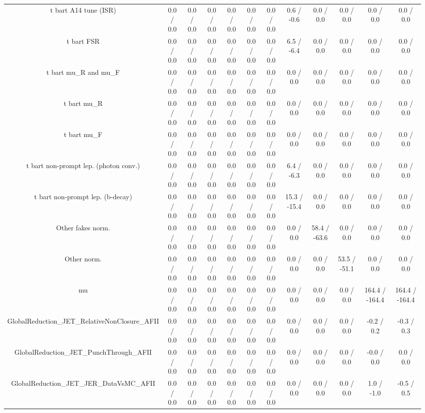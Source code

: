 \begin{table}[htbp]
\begin{center}
\begin{tabular}{|c|c|c|c|c|c|c|c|c|c|c|c|}
  t bar{t} A14 tune (ISR) & 0.0 / 0.0 & 0.0 / 0.0 & 0.0 / 0.0 & 0.0 / 0.0 & 0.0 / 0.0 & 0.0 / 0.0 & 0.6 / -0.6 & 0.0 / 0.0 & 0.0 / 0.0 & 0.0 / 0.0 & 0.0 / 0.0 \\ 
  t bar{t} FSR & 0.0 / 0.0 & 0.0 / 0.0 & 0.0 / 0.0 & 0.0 / 0.0 & 0.0 / 0.0 & 0.0 / 0.0 & 6.5 / -6.4 & 0.0 / 0.0 & 0.0 / 0.0 & 0.0 / 0.0 & 0.0 / 0.0 \\ 
  t bar{t}  mu_{R} and  mu_{F} & 0.0 / 0.0 & 0.0 / 0.0 & 0.0 / 0.0 & 0.0 / 0.0 & 0.0 / 0.0 & 0.0 / 0.0 & 0.0 / 0.0 & 0.0 / 0.0 & 0.0 / 0.0 & 0.0 / 0.0 & 0.0 / 0.0 \\ 
  t bar{t}  mu_{R} & 0.0 / 0.0 & 0.0 / 0.0 & 0.0 / 0.0 & 0.0 / 0.0 & 0.0 / 0.0 & 0.0 / 0.0 & 0.0 / 0.0 & 0.0 / 0.0 & 0.0 / 0.0 & 0.0 / 0.0 & 0.0 / 0.0 \\ 
  t bar{t}  mu_{F} & 0.0 / 0.0 & 0.0 / 0.0 & 0.0 / 0.0 & 0.0 / 0.0 & 0.0 / 0.0 & 0.0 / 0.0 & 0.0 / 0.0 & 0.0 / 0.0 & 0.0 / 0.0 & 0.0 / 0.0 & 0.0 / 0.0 \\ 
  t bar{t} non-prompt lep. (photon conv.) & 0.0 / 0.0 & 0.0 / 0.0 & 0.0 / 0.0 & 0.0 / 0.0 & 0.0 / 0.0 & 0.0 / 0.0 & 6.4 / -6.3 & 0.0 / 0.0 & 0.0 / 0.0 & 0.0 / 0.0 & 0.0 / 0.0 \\ 
  t bar{t} non-prompt lep. (b-decay) & 0.0 / 0.0 & 0.0 / 0.0 & 0.0 / 0.0 & 0.0 / 0.0 & 0.0 / 0.0 & 0.0 / 0.0 & 15.3 / -15.4 & 0.0 / 0.0 & 0.0 / 0.0 & 0.0 / 0.0 & 0.0 / 0.0 \\ 
  Other fakes norm. & 0.0 / 0.0 & 0.0 / 0.0 & 0.0 / 0.0 & 0.0 / 0.0 & 0.0 / 0.0 & 0.0 / 0.0 & 0.0 / 0.0 & 58.4 / -63.6 & 0.0 / 0.0 & 0.0 / 0.0 & 0.0 / 0.0 \\ 
  Other norm. & 0.0 / 0.0 & 0.0 / 0.0 & 0.0 / 0.0 & 0.0 / 0.0 & 0.0 / 0.0 & 0.0 / 0.0 & 0.0 / 0.0 & 0.0 / 0.0 & 53.5 / -51.1 & 0.0 / 0.0 & 0.0 / 0.0 \\ 
  mu & 0.0 / 0.0 & 0.0 / 0.0 & 0.0 / 0.0 & 0.0 / 0.0 & 0.0 / 0.0 & 0.0 / 0.0 & 0.0 / 0.0 & 0.0 / 0.0 & 0.0 / 0.0 & 164.4 / -164.4 & 164.4 / -164.4 \\ 
  GlobalReduction_JET_RelativeNonClosure_AFII & 0.0 / 0.0 & 0.0 / 0.0 & 0.0 / 0.0 & 0.0 / 0.0 & 0.0 / 0.0 & 0.0 / 0.0 & 0.0 / 0.0 & 0.0 / 0.0 & 0.0 / 0.0 & -0.2 / 0.2 & -0.3 / 0.3 \\ 
  GlobalReduction_JET_PunchThrough_AFII & 0.0 / 0.0 & 0.0 / 0.0 & 0.0 / 0.0 & 0.0 / 0.0 & 0.0 / 0.0 & 0.0 / 0.0 & 0.0 / 0.0 & 0.0 / 0.0 & 0.0 / 0.0 & -0.0 / 0.0 & 0.0 / 0.0 \\ 
  GlobalReduction_JET_JER_DataVsMC_AFII & 0.0 / 0.0 & 0.0 / 0.0 & 0.0 / 0.0 & 0.0 / 0.0 & 0.0 / 0.0 & 0.0 / 0.0 & 0.0 / 0.0 & 0.0 / 0.0 & 0.0 / 0.0 & 1.0 / -1.0 & -0.5 / 0.5 \\ 

\end{tabular}
\end{center}
\end{table}
